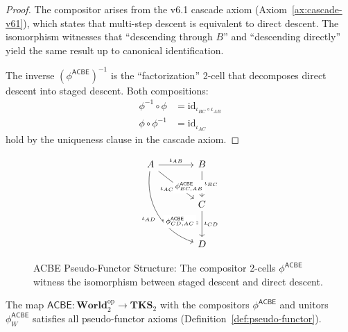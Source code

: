 \begin{proof}
The compositor arises from the v6.1 cascade axiom (Axiom~\ref{ax:cascade-v61}),
which states that multi-step descent is equivalent to direct descent. The
isomorphism witnesses that ``descending through $B$'' and ``descending directly''
yield the same result up to canonical identification.

The inverse $(\phi^{\mathsf{ACBE}})^{-1}$ is the ``factorization'' 2-cell that
decomposes direct descent into staged descent. Both compositions:
\begin{align*}
  \phi^{-1} \circ \phi &= \mathrm{id}_{\iota_{BC} \circ \iota_{AB}} \\
  \phi \circ \phi^{-1} &= \mathrm{id}_{\iota_{AC}}
\end{align*}
hold by the uniqueness clause in the cascade axiom.
\end{proof}

\begin{figure}[ht]
\centering
\[
\begin{tikzcd}[row sep=large, column sep=large]
  A
    \arrow[r, "\iota_{AB}"{name=AB}]
    \arrow[dr, "\iota_{AC}"'{name=AC}]
    \arrow[ddr, bend right=40, "\iota_{AD}"'{name=AD}]
  &
  B
    \arrow[d, "\iota_{BC}"{name=BC}]
  \\
  &
  C
    \arrow[d, "\iota_{CD}"{name=CD}]
    \arrow[Rightarrow, dashed, from=BC, to=AC, shorten <=4pt, shorten >=4pt, "\phi^{\mathsf{ACBE}}_{BC,AB}" description]
  \\
  &
  D
    \arrow[Rightarrow, dashed, from=CD, to=AD, shorten <=4pt, shorten >=4pt, "\phi^{\mathsf{ACBE}}_{CD,AC}" description]
\end{tikzcd}
\]
\caption{ACBE Pseudo-Functor Structure: The compositor 2-cells $\phi^{\mathsf{ACBE}}$
witness the isomorphism between staged descent and direct descent.}
\label{fig:acbe-pseudo-functor}
\end{figure}

\begin{theorem}
\label{thm:acbe-pseudo-functor}
The map $\mathsf{ACBE} : \mathbf{World}_2^{\mathrm{op}} \to \mathbf{TKS}_2$ with
the compositors $\phi^{\mathsf{ACBE}}$ and unitors $\phi^{\mathsf{ACBE}}_W$
satisfies all pseudo-functor axioms (Definition~\ref{def:pseudo-functor}).
\end{theorem}

